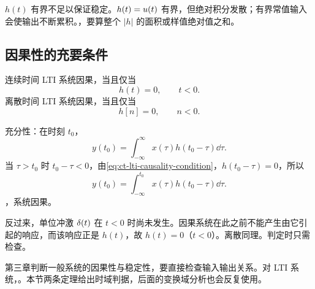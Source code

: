 \begin{pitfall}[只检查冲激响应是否有界]
  $h(t)$ 有界不足以保证稳定。$h(t)=u(t)$ 有界，但绝对积分发散；有界常值输入会使输出不断累积。，要算整个 $|h|$ 的面积或样值绝对值之和。
\end{pitfall}

\subsection{因果性的充要条件}

\begin{theorem}
  \label{thm:lti-causality-impulse-response}
  连续时间 LTI 系统因果，当且仅当
  \begin{equation}
    h(t)=0,
    \qquad t<0.
    \label{eq:ct-lti-causality-condition}
  \end{equation}
  离散时间 LTI 系统因果，当且仅当
  \begin{equation}
    h[n]=0,
    \qquad n<0.
    \label{eq:dt-lti-causality-condition}
  \end{equation}
\end{theorem}

充分性：在时刻 $t_0$，
\[
  y(t_0)=\int_{-\infty}^{\infty}x(\tau)h(t_0-\tau)\dd\tau.
\]
当 $\tau>t_0$ 时 $t_0-\tau<0$，由\cref{eq:ct-lti-causality-condition}，$h(t_0-\tau)=0$，所以
\begin{equation}
  y(t_0)=\int_{-\infty}^{t_0}x(\tau)h(t_0-\tau)\dd\tau.
  \label{eq:causal-lti-output-past-only}
\end{equation}
，系统因果。

反过来，单位冲激 $\delta(t)$ 在 $t<0$ 时尚未发生。因果系统在此之前不能产生由它引起的响应，而该响应正是 $h(t)$，故 $h(t)=0$（$t<0$）。离散同理。判定时只需检查。

\begin{remark}[与第三章判据的关系]
  第三章判断一般系统的因果性与稳定性，要直接检查输入输出关系。对 LTI 系统，。本节两条定理给出时域判据，后面的变换域分析也会反复使用。
\end{remark}
